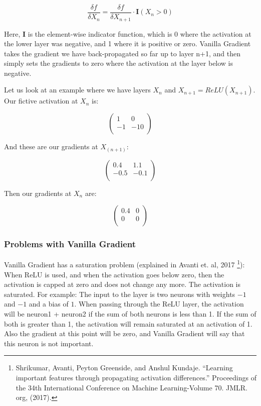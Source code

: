 \documentclass[12pt,]{krantz}
\begin{document}
\[\frac{\delta f}{\delta X_n} = \frac{\delta f}{\delta X_{n+1}} \cdot \mathbf{I}(X_n > 0)\]

Here, \(\mathbf{I}\) is the element-wise indicator function, which is 0
where the activation at the lower layer was negative, and 1 where it is
positive or zero. Vanilla Gradient takes the gradient we have
back-propagated so far up to layer n+1, and then simply sets the
gradients to zero where the activation at the layer below is negative.

Let us look at an example where we have layers \(X_n\) and
\(X_{n+1}=ReLU(X_{n+1})\). Our fictive activation at \(X_n\) is:

\[
\begin{pmatrix}
1 & 0 \\
-1 & -10 \\
\end{pmatrix}
\]

And these are our gradients at \(X_{(n+1)}\):

\[
\begin{pmatrix}
0.4 & 1.1 \\
-0.5 & -0.1  \\
\end{pmatrix}
\]

Then our gradients at \(X_n\) are:

\[
\begin{pmatrix}
0.4 & 0 \\
 0 & 0  \\
\end{pmatrix}
\]

\subsubsection{Problems with Vanilla
Gradient}\label{problems-with-vanilla-gradient}

Vanilla Gradient has a saturation problem (explained in Avanti et. al,
2017 \footnote{Shrikumar, Avanti, Peyton Greenside, and Anshul Kundaje.
  ``Learning important features through propagating activation
  differences.'' Proceedings of the 34th International Conference on
  Machine Learning-Volume 70. JMLR. org, (2017).}): When ReLU is used,
and when the activation goes below zero, then the activation is capped
at zero and does not change any more. The activation is saturated. For
example: The input to the layer is two neurons with weights \(-1\) and
\(-1\) and a bias of \(1\). When passing through the ReLU layer, the
activation will be neuron1 + neuron2 if the sum of both neurons is less
than 1. If the sum of both is greater than 1, the activation will remain
saturated at an activation of 1. Also the gradient at this point will be
zero, and Vanilla Gradient will say that this neuron is not important.
\end{document}
